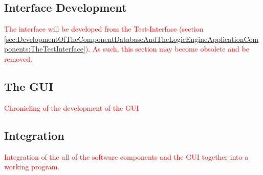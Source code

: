 \subsection{Interface Development}
\label{sec:DevelopmentOfAnInterfaceBetweenTheComponentDatabaseAndTheLogicEngineAndDevelopmentOfAGUI:InterfaceDevelopment}
\textcolor{red}{The interface will be developed from the Test-Interface (section \ref{sec:DevelopmentOfTheComponentDatabaseAndTheLogicEngineApplicationComponents:TheTestInterface}). As such, this section may become obsolete and be removed.}

\subsection{The GUI}
\label{sec:DevelopmentOfAnInterfaceBetweenTheComponentDatabaseAndTheLogicEngineAndDevelopmentOfAGUI:TheGUI}
\textcolor{red}{Chronicling of the development of the GUI}

\subsection{Integration}
\label{sec:DevelopmentOfAnInterfaceBetweenTheComponentDatabaseAndTheLogicEngineAndDevelopmentOfAGUI:Integration}
\textcolor{red}{Integration of the all of the software components and the GUI together into a working program.}

\fi